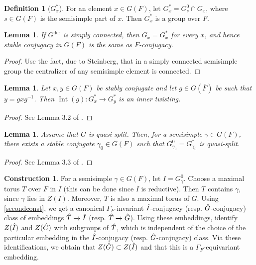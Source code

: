 \documentclass[11pt,a4paper]{article}
\theoremstyle{definition}
\newtheorem{D}[shared]{Definition}
\newtheorem{const}[shared]{Construction}
\theoremstyle{plain}
\newtheorem{Le}[shared]{Lemma}
\theoremstyle{remark}
\theoremstyle{plain}
\DeclareMathOperator{\Int}{Int}
\begin{document}
\begin{D}[$G_x^*$]\label{stargroupdef}
    For an element $x \in G(F)$, let $G_x^* = G_s^0 \cap G_x$, where $s \in G(F)$ is the semisimple part of $x$. Then $G_x^*$ is a group over $F$.
\end{D}

\begin{Le}\label{simplyconnectedlemma}
    If $G^{\text{der}}$ is simply connected, then $G_x = G_x^*$ for every $x$, and hence stable conjugacy in $G(F)$ is the same as $\overline{F}$-conjugacy. 
\end{Le}
\begin{proof}
    Use the fact, due to Steinberg, that in a simply connected semisimple group the centralizer of any semisimple element is connected.
\end{proof}

\begin{Le}\label{stabconjlem1}
    Let $x,y \in G(F)$ be stably conjugate and let $g \in G(\overline{F})$ be such that $y = gxg^{-1}$. Then $\Int(g): G_x^* \xrightarrow[]{} G_y^*$ is an inner twisting.
\end{Le}
\begin{proof}
    See Lemma 3.2 of \cite{MR683003}.
\end{proof}

\begin{Le}
    Assume that $G$ is quasi-split. Then, for a semisimple $\gamma \in G(F)$, there exists a stable conjugate $\gamma_0 \in G(F)$ such that $G_{\gamma_0}^0 = G_{\gamma_0}^*$ is quasi-split.
\end{Le}
\begin{proof}
    See Lemma 3.3 of \cite{MR683003}.
\end{proof}

\begin{const}\label{stableconjconst}
    For a semisimple $\gamma \in G(F)$, let $I = G_{\gamma}^0$. Choose a maximal torus $T$ over $F$ in $I$ (this can be done since $I$ is reductive). Then $T$ contains $\gamma$, since $\gamma$ lies in $Z(I)$. Moreover, $T$ is also a maximal torus of $G$. Using \ref{secondconst}, we get a canonical $\Gamma_F$-invariant $\Hat{I}$-conjugacy (resp. $\Hat{G}$-conjugacy) class of embeddings $\Hat{T} \xrightarrow[]{} \Hat{I}$ (resp. $\Hat{T} \xrightarrow[]{} \Hat{G}$). Using these embeddings, identify $Z(\Hat{I})$ and $Z(\Hat{G})$ with subgroups of $\Hat{T}$, which is independent of the choice of the particular embedding in the $\Hat{I}$-conjugacy (resp. $\Hat{G}$-conjugacy) class. Via these identifications, we obtain that $Z(\Hat{G}) \subset Z(\Hat{I})$ and that this is a $\Gamma_F$-equivariant embedding.
\end{const}
\end{document}
